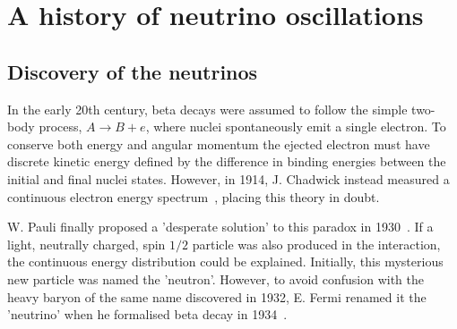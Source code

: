 \begin{comment}
-Neutrino physics covers the widest possible range of
-Proposal of a mysterious undetector particle to explain beta decays in the 1930s through to the
resolutions of a 30-year problem with the confirmation of oscillations in the early 2000s and onto
the precision era.
-Neutrino oscillations first discoveed in 1957 when Bruno Pornecorvo proposed a model in which
neutrinos oscilate to antineutrinos and back, similar to the kain. It was actually shown that
neutrinos iscilate from one flavour to another.
-The field of neutrino physics is ever expanding with a new generation of experiments planned for
the coming years.
This chapter aims to provide an introduction to neutrino...
\end{comment}

\section{A history of neutrino oscillations}
\label{sec:theory_history}

\subsection{Discovery of the neutrinos} %
\label{sec:theory_history_neutrinos}

In the early 20th century, beta decays were assumed to follow the simple two-body process,
$A \rightarrow B + e$, where nuclei spontaneously emit a single electron. To conserve both energy
and angular momentum the ejected electron must have discrete kinetic energy defined by the
difference in binding energies between the initial and final nuclei states. However, in 1914,
J. Chadwick instead measured a continuous electron energy spectrum~\cite{chadwick1914}, placing
this theory in doubt.

W. Pauli finally proposed a 'desperate solution' to this paradox in 1930~\cite{pauli1930}. If a
light, neutrally charged, spin $1/2$ particle was also produced in the interaction, the continuous
energy distribution could be explained. Initially, this mysterious new particle was named the
'neutron'. However, to avoid confusion with the heavy baryon of the same name discovered in 1932,
E. Fermi renamed it the 'neutrino' when he formalised beta decay in 1934~\cite{fermi1934}.

